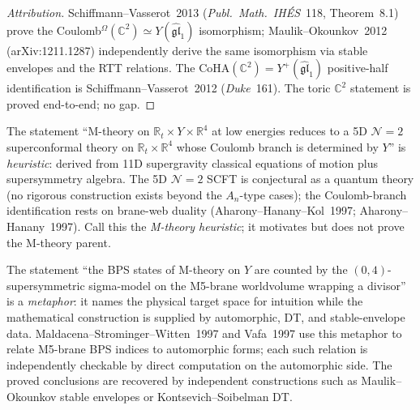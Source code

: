 \begin{proof}[Attribution]
Schiffmann--Vasserot~2013 (\emph{Publ.\ Math.\ IH\'ES}~118, Theorem~8.1) prove the Coulomb$^\Omega(\mathbb{C}^2) \simeq Y(\widehat{\mathfrak{gl}}_1)$ isomorphism; Maulik--Okounkov~2012 (arXiv:1211.1287) independently derive the same isomorphism via stable envelopes and the RTT relations. The $\mathrm{CoHA}(\mathbb{C}^2) = Y^+(\widehat{\mathfrak{gl}}_1)$ positive-half identification is Schiffmann--Vasserot~2012 (\emph{Duke}~161). The toric $\mathbb{C}^2$ statement is proved end-to-end; no gap.
\end{proof}

\begin{remark}[Physics heuristic: M-theory on $\mathbb{R}_t \times Y \times \mathbb{R}^4 \to$ 5D $\mathcal{N} = 2$]
\label{rem:m-theory-heuristic-5d-n2}
The statement ``M-theory on $\mathbb{R}_t \times Y \times \mathbb{R}^4$ at low energies reduces to a 5D $\mathcal{N} = 2$ superconformal theory on $\mathbb{R}_t \times \mathbb{R}^4$ whose Coulomb branch is determined by $Y$'' is \emph{heuristic}: derived from 11D supergravity classical equations of motion plus supersymmetry algebra. The 5D $\mathcal{N} = 2$ SCFT is conjectural as a quantum theory (no rigorous construction exists beyond the $A_n$-type cases); the Coulomb-branch identification rests on brane-web duality (Aharony--Hanany--Kol~1997; Aharony--Hanany~1997). Call this the \emph{M-theory heuristic}; it motivates but does not prove the M-theory parent.
\end{remark}

\begin{remark}
\label{rem:0-4-sigma-model-metaphor}
The statement ``the BPS states of M-theory on $Y$ are counted by the $(0, 4)$-supersymmetric sigma-model on the M5-brane worldvolume wrapping a divisor'' is a \emph{metaphor}: it names the physical target space for intuition while the mathematical construction is supplied by automorphic, DT, and stable-envelope data. Maldacena--Strominger--Witten~1997 and Vafa~1997 use this metaphor to relate M5-brane BPS indices to automorphic forms; each such relation is independently checkable by direct computation on the automorphic side. The proved conclusions are recovered by independent constructions such as Maulik--Okounkov stable envelopes or Kontsevich--Soibelman DT.
\end{remark}

